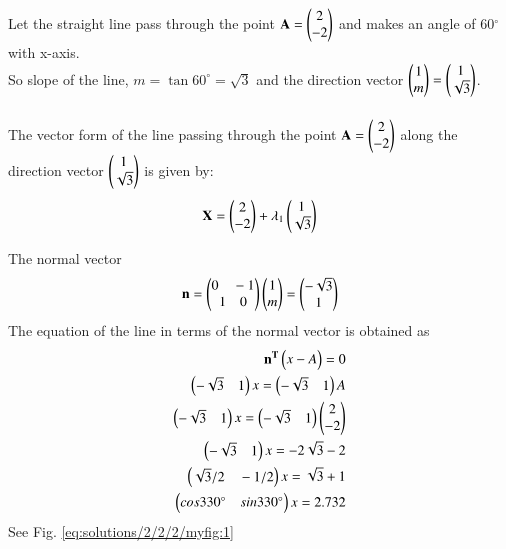 Let the straight line pass through the point $\mathbf{A}=\begin{pmatrix}2 \\-2\end{pmatrix}$ and makes an angle of 60$^{\circ}$ with x-axis.\\
So slope of the line, $m=\tan 60^{\circ}=\sqrt{3}$ and the direction vector  $\begin{pmatrix}1 \\m\end{pmatrix} = \begin{pmatrix}1 \\\sqrt{3}\end{pmatrix}$.\\\\
The vector form of the line passing through the point $\mathbf{A}=\begin{pmatrix}2 \\-2\end{pmatrix}$ along the direction vector  $\begin{pmatrix}1 \\\sqrt{3}\end{pmatrix}$ is given by:
\begin{align}
\mathbf{X}=\begin{pmatrix}2 \\-2\end{pmatrix}+ \lambda_1\begin{pmatrix}1 \\\sqrt{3}\end{pmatrix}
\end{align} 

The normal vector
\begin{align}
\mathbf{n}=\begin{pmatrix}0 \quad -1\\1 \quad 0\end{pmatrix} \begin{pmatrix}1 \\m\end{pmatrix} = \begin{pmatrix}-\sqrt3\\ 1\end{pmatrix}
\end{align}
The equation of the line in terms of the normal vector is obtained as
\begin{align}
\mathbf{n^T}\begin{pmatrix}x-A\end{pmatrix}  =0\\
\begin{pmatrix}-\sqrt3\quad 1\end{pmatrix}x=\begin{pmatrix}-\sqrt3\quad 1\end{pmatrix}A\\
\begin{pmatrix}-\sqrt3\quad 1\end{pmatrix}x=\begin{pmatrix}-\sqrt3\quad 1\end{pmatrix}\begin{pmatrix}2 \\-2\end{pmatrix}\\
\begin{pmatrix}-\sqrt3\quad 1\end{pmatrix}x=-2\sqrt{3}-2\\
\begin{pmatrix}\sqrt3/2\quad -1/2\end{pmatrix}x=\sqrt{3}+1\\
\begin{pmatrix} cos 330^{\circ} \quad sin 330^{\circ}\end{pmatrix}x= 2.732
\end{align}
See Fig.     \ref{eq:solutions/2/2/2/myfig:1}

